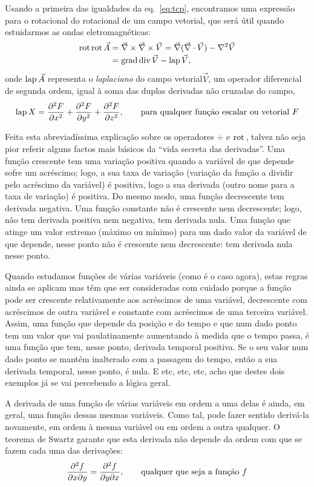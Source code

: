 Usando a primeira das igualdades da eq.~\eqref{eq:tcp}, encontramos uma
expressão para o rotacional do rotacional de um campo vetorial, que será útil
quando estuidarmos as ondas eletromagnéticas:
\begin{align}
\rot\rot \vec A&=\vec\nabla\times\vec\nabla\times\vec V=
\vec \nabla(\vec\nabla\cdot\vec V)-\nabla^2\vec V\nonumber\\
&=\grad\div \vec V-\lap\vec V,
\end{align}
onde $\lap\vec A$ representa o \emph{laplaciano} do campo vetorial$\vec V$, um
operador diferencial de segunda ordem, igual à soma das duplas derivadas não
cruzadas do campo,
\begin{equation}
\text{lap}\, X =
\frac{\partial^2 F}{\partial x^2}+
\frac{\partial^2 F}{\partial y^2}+
\frac{\partial^2 F}{\partial z^2},\qquad\text{para qualquer função escalar ou vetorial $F$}
\end{equation}
{\small%
  Feita esta abreviadíssima explicação sobre os operadores $\div$ e $\text{rot}\,$,
  talvez não seja pior referir alguns factos mais básicos da ``vida secreta
  das derivadas''. Uma função crescente tem uma variação positiva quando a
  variável de que depende sofre um acréscimo; logo, a sua taxa de variação
  (variação da função a dividir pelo acréscimo da variável) é positiva, logo a
  sua derivada (outro nome para a taxa de variação) é positiva. Do mesmo modo,
  uma função decrescente tem derivada negativa. Uma função constante não é
  crescente nem decrescente; logo, não tem derivada positiva nem negativa, tem
  derivada nula.  Uma função que atinge um valor extremo (máximo ou mínimo) para
  um dado valor da variável de que depende, nesse ponto não é crescente nem
  decrescente: tem derivada nula nesse ponto.

  Quando estudamos funções de várias variáveis (como é o caso agora), estas
  regras ainda se aplicam mas têm que ser consideradas com cuidado porque a
  função pode ser crescente relativamente aos acréscimos de uma variável,
  decrescente com acréscimos de outra variável e constante com acréscimos de uma
  terceira variável. Assim, uma função que depende da posição e do tempo e que
  num dado ponto tem um valor que vai paulatinamente aumentando à medida que o
  tempo passa, é uma função que tem, nesse ponto, derivada temporal positiva. Se
  o seu valor num dado ponto se mantém inalterado com a passagem do tempo, então
  a sua derivada temporal, nesse ponto, é nula. E etc, etc, etc, acho que destes
  dois exemplos já se vai percebendo a lógica geral.

  A derivada de uma função de várias variáveis em ordem a uma delas é ainda, em
  geral, uma função dessas mesmas variáveis. Como tal, pode fazer sentido
  derivá-la novamente, em ordem à mesma variável ou em ordem a outra qualquer. O
  teorema de Swartz garante que esta derivada não depende da ordem com que se
  fazem cada uma das derivações:
  \begin{equation*}
    \frac{\partial^2 f}{\partial x\partial y}=
    \frac{\partial^2 f}{\partial y\partial x},\qquad\text{qualquer que seja a função $f$}
  \end{equation*}
}

